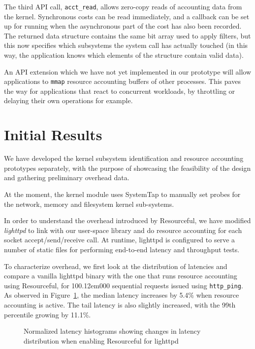 \documentclass[letterpaper,twocolumn,10pt]{article}
\newcommand{\pname}{Resourceful}
\begin{document}
The third API call, \texttt{acct\_read}, allows zero-copy reads of accounting
data from the kernel. Synchronous costs can be read immediately, and a callback
can be set up for running when the asynchronous part of the cost has also been
recorded. The returned data structure contains the same bit array used to apply
filters, but this now specifies which subsystems the system call has actually touched
(in this way, the application knows which elements of the structure contain valid data).

An API extension which we have not yet implemented in our prototype will allow applications
to \texttt{mmap} resource accounting buffers of other processes. This paves the way for applications that
react to concurrent workloads, by throttling or delaying their own
operations for example.

\section{Initial Results}
We have developed the kernel subsystem identification and resource accounting
prototypes separately, with the purpose of showcasing the feasibility of the design
and gathering preliminary overhead data.

At the moment, the kernel module uses SystemTap to manually set probes for the
network, memory and filesystem kernel sub-systems.

In order to understand the overhead introduced by \pname, we have modified
\textit{lighttpd} to link with our user-space library and do resource accounting
for each socket accept/send/receive call. At runtime, lighttpd is configured to serve
a number of static files for performing end-to-end latency and throughput tests.

To characterize overhead, we first look at the distribution of latencies and
compare a vanilla lighttpd binary with the one that runs resource accounting
using \pname, for 10{\kern 0.12em}000 sequential requests issued using \texttt{http\_ping}. As
observed in Figure~\ref{fig:experiment1}, the median latency increases by 5.4\%
when resource accounting is active. The tail latency is also slightly increased,
with the 99th percentile growing by 11.1\%.
\begin{figure}[ht!] 
	\centering
	\hspace*{-0.05\columnwidth} 
	\def\svgwidth{\columnwidth}
	
	\caption{Normalized latency histograms showing changes in latency distribution when enabling \pname{ }for lighttpd} 
	\label{fig:experiment1}
\end{figure}
\end{document}
